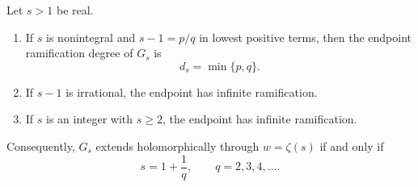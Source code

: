 \begin{theorem}
\label{ep:thm:classification}
Let $s>1$ be real.
\begin{enumerate}
\item If $s$ is nonintegral and $s-1=p/q$ in lowest positive terms,
then the endpoint ramification degree of $G_s$ is
\[
 d_s=\min\{p,q\}.
\]
\item If $s-1$ is irrational, the endpoint has infinite ramification.
\item If $s$ is an integer with $s\ge2$, the endpoint has infinite
ramification.
\end{enumerate}
Consequently, $G_s$ extends holomorphically through $w=\zeta(s)$
if and only if
\begin{equation}
 s=1+\frac1q,\qquad q=2,3,4,\ldots.
 \label{ep:eq:exceptional}
\end{equation}
\end{theorem}

